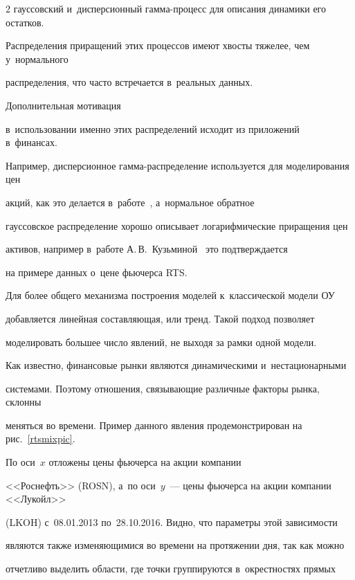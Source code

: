 \begin{multicols}{2}
гауссовский и~дис\-пер\-сионный гам\-ма-про\-цесс для описания динамики его остатков. 


Распределения прираще\-ний этих процессов имеют хвосты тяжелее, чем у~нормального 


распределения, что часто встречается в~реальных данных. 





Дополнительная мотивация 


в~использовании именно этих распределений исходит из приложений в~финансах. 


Например, дисперсионное гам\-ма-рас\-пре\-де\-ле\-ние используется для моделирования цен 


акций, как это делается в~работе~\cite{Fin2009}, а~нормальное обратное 


гауссовское распределение хорошо описывает логарифмические приращения цен 


активов, например в~работе А.\,В.~Кузьминой~\cite{Kuzmina2011} это подтверждается 


на примере данных о~цене фьючерса RTS.





Для более общего механизма построения моделей к~классической модели ОУ 


добавляется линейная составляющая, или тренд. Такой подход позволяет 


моделировать большее число явлений, не выходя за рамки одной модели.





Как известно, финансовые рынки являются динамическими и~нестационарными 


системами. Поэтому отношения, связывающие различные факторы рынка, склонны 


меняться во времени. Пример данного явления продемонстрирован на рис.~\ref{rtsmixpic}. 


По оси~$x$ отложены цены фьючерса на акции компании 


<<Роснефть>> (ROSN), а~по оси~$y$~--- цены фьючерса на акции компании <<Лукойл>> 


(LKOH) с~08.01.2013 по~28.10.2016. Видно, что параметры этой зависимости 


являются также изменяющимися во времени на протяжении дня, так как можно 


отчетливо выделить области, где точки группируются в~окрестностях прямых 



\end{multicols}
